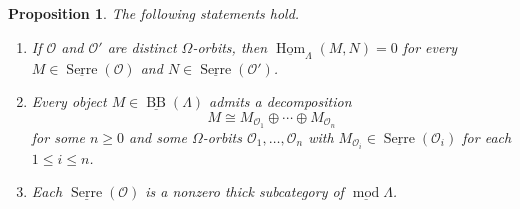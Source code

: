 \documentclass{amsart}
\newtheorem{prop}[thm]{Proposition}
\theoremstyle{definition}
\theoremstyle{remark}
\numberwithin{equation}{thm}
\def\BB{\operatorname{BB}}
\def\Hom{\operatorname{Hom}}
\def\L{\Lambda}
\def\le{\leqslant}
\def\ge{\geqslant}
\def\mod{\operatorname{mod}}
\def\O{\mathcal{O}}
\def\Serre{\operatorname{Serre}}
\begin{document}
\begin{prop}\label{stable orbit decomposition}
The following statements hold.
\begin{enumerate}[{\rm (1)}]
\item If $\O$ and $\O'$ are distinct $\Omega$-orbits, then $\underline{\Hom}_\L(M,N)=0$ for every $M\in\underline{\Serre}(\O)$ and $N\in\underline{\Serre}(\O')$.
\item Every object $M\in\underline{\BB}(\L)$ admits a decomposition 
$$
M\cong M_{\O_1}\oplus\cdots\oplus M_{\O_n}
$$ 
for some $n\ge0$ and some $\Omega$-orbits $\O_1,\ldots,\O_n$ with $M_{\O_i}\in\underline{\Serre}(\O_i)$ for each $1\le i\le n$.
\item Each $\underline{\Serre}(\O)$ is a nonzero thick subcategory of
$\underline{\mod}\L$.
\end{enumerate}
\end{prop}
\end{document}
